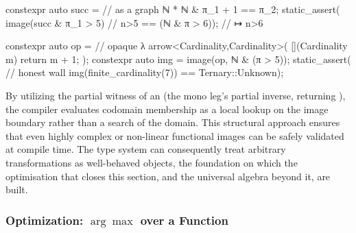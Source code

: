\documentclass[11pt, a4paper]{article}
\begin{document}
\begin{listing}[htbp]
\caption{Structure decides where opacity walls.
\textbf{Left}: the successor as a \emph{graph}; its image over $\{n>5\}$ is the affine pushforward $\{n>6\}$, decided with no search of the domain.
\textbf{Right}: the same map as an \emph{opaque} arrow the compiler cannot see through, so the existential $\exists x.\,x>5 \wedge y=\mathrm{succ}(x)$ is undecidable on the transfinite carrier:  realises  yet its membership is honestly .  The Rice boundary is for opacity, not for functions (abridged from the checked-in witnesses).}
\label{lst:functional_image_factorization}
\noindent
\begin{minipage}[t]{0.49\linewidth}
\begin{cpp}
constexpr auto succ =        // as a graph
  ℕ * ℕ & π_1 + 1 == π_2;
static_assert(
  image(succ & π_1 > 5)  // {n>5}
  == (ℕ & π > 6));      //  ↦ {n>6}
\end{cpp}
\end{minipage}\hfill
\begin{minipage}[t]{0.49\linewidth}
\begin{cpp}
constexpr auto op =          // opaque λ
  arrow<Cardinality,Cardinality>(
    [](Cardinality m){ return m + 1; });
constexpr auto img =
  image(op, ℕ & (π > 5));
static_assert(               // honest wall
  img(finite_cardinality(7)) == Ternary::Unknown);
\end{cpp}
\end{minipage}
\end{listing}

By utilizing the  partial witness of an  (the mono leg's partial inverse, returning ), the compiler evaluates codomain membership as a local lookup on the image boundary rather than a search of the domain.
This structural approach ensures that even highly complex or non-linear functional images can be safely validated at compile time.
The type system can consequently treat arbitrary transformations as well-behaved objects, the foundation on which the optimisation that closes this section, and the universal algebra beyond it, are built.

\subsubsection{Optimization: $\arg\max$ over a Function}
\label{sec:argmax}
\end{document}
